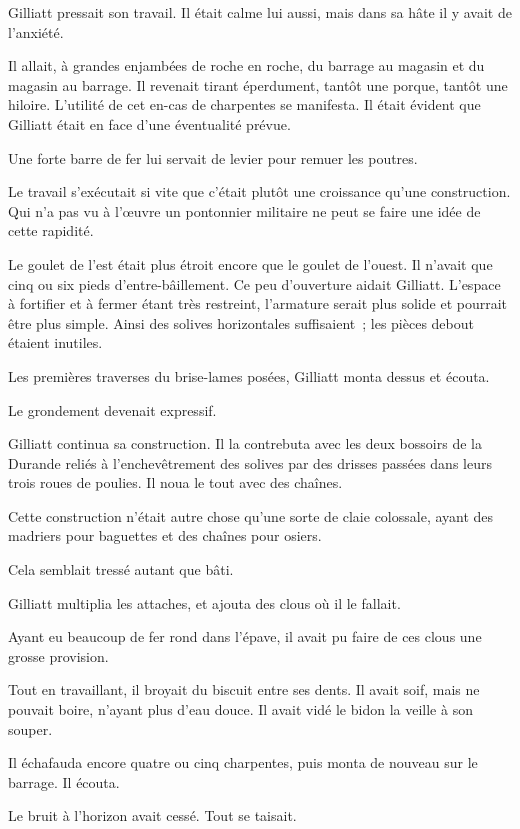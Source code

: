 \documentclass[french,twoside]{book} %
\begin{document}
Gilliatt pressait son travail. Il était calme lui aussi, mais dans sa hâte il y avait de l’anxiété.\par
Il allait, à grandes enjambées de roche en roche, du barrage au magasin et du magasin au barrage. Il revenait tirant éperdument, tantôt une porque, tantôt une hiloire. L’utilité de cet en-cas de charpentes se manifesta. Il était évident que Gilliatt était en face d’une éventualité prévue.\par
 Une forte barre de fer lui servait de levier pour remuer les poutres.\par
Le travail s’exécutait si vite que c’était plutôt une croissance qu’une construction. Qui n’a pas vu à l’œuvre un pontonnier militaire ne peut se faire une idée de cette rapidité.\par
Le goulet de l’est était plus étroit encore que le goulet de l’ouest. Il n’avait que cinq ou six pieds d’entre-bâillement. Ce peu d’ouverture aidait Gilliatt. L’espace à fortifier et à fermer étant très restreint, l’armature serait plus solide et pourrait être plus simple. Ainsi des solives horizontales suffisaient ; les pièces debout étaient inutiles.\par
Les premières traverses du brise-lames posées, Gilliatt monta dessus et écouta.\par
Le grondement devenait expressif.\par
Gilliatt continua sa construction. Il la contrebuta avec les deux bossoirs de la Durande reliés à l’enchevêtrement des solives par des drisses passées dans leurs trois roues de poulies. Il noua le tout avec des chaînes.\par
Cette construction n’était autre chose qu’une sorte de claie colossale, ayant des madriers pour baguettes et des chaînes pour osiers.\par
Cela semblait tressé autant que bâti.\par
Gilliatt multiplia les attaches, et ajouta des clous où il le fallait.\par
Ayant eu beaucoup de fer rond dans l’épave, il avait pu faire de ces clous une grosse provision.\par
Tout en travaillant, il broyait du biscuit entre ses  dents. Il avait soif, mais ne pouvait boire, n’ayant plus d’eau douce. Il avait vidé le bidon la veille à son souper.\par
Il échafauda encore quatre ou cinq charpentes, puis monta de nouveau sur le barrage. Il écouta.\par
Le bruit à l’horizon avait cessé. Tout se taisait.\par
\end{document}
